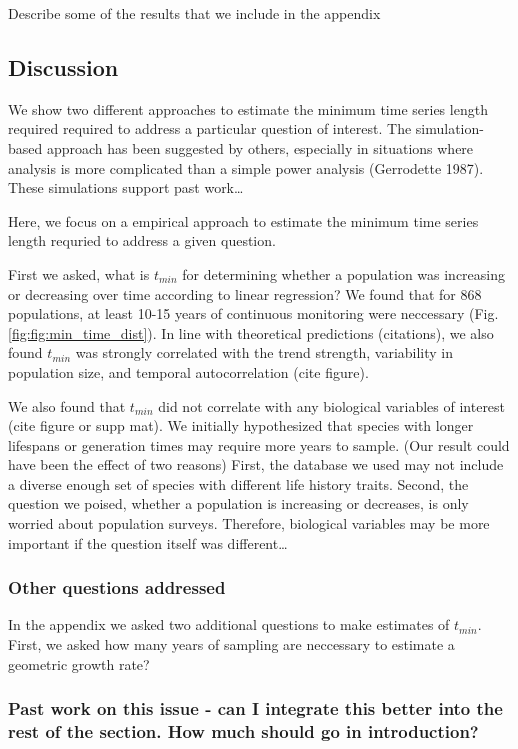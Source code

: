 \documentclass[12pt,]{article}
\begin{document}
Describe some of the results that we include in the appendix

\subsection{Discussion}\label{discussion}

We show two different approaches to estimate the minimum time series
length required required to address a particular question of interest.
The simulation-based approach has been suggested by others, especially
in situations where analysis is more complicated than a simple power
analysis (Gerrodette 1987). These simulations support past work\ldots{}

Here, we focus on a empirical approach to estimate the minimum time
series length requried to address a given question.

First we asked, what is \(t_{min}\) for determining whether a population
was increasing or decreasing over time according to linear regression?
We found that for 868 populations, at least 10-15 years of continuous
monitoring were neccessary (Fig. \ref{fig:fig:min_time_dist}). In line
with theoretical predictions (citations), we also found \(t_{min}\) was
strongly correlated with the trend strength, variability in population
size, and temporal autocorrelation (cite figure).

We also found that \(t_{min}\) did not correlate with any biological
variables of interest (cite figure or supp mat). We initially
hypothesized that species with longer lifespans or generation times may
require more years to sample. (Our result could have been the effect of
two reasons) First, the database we used may not include a diverse
enough set of species with different life history traits. Second, the
question we poised, whether a population is increasing or decreases, is
only worried about population surveys. Therefore, biological variables
may be more important if the question itself was different\ldots{}

\subsubsection{Other questions
addressed}\label{other-questions-addressed}

In the appendix we asked two additional questions to make estimates of
\(t_{min}\). First, we asked how many years of sampling are neccessary
to estimate a geometric growth rate?

\subsubsection{Past work on this issue - can I integrate this better
into the rest of the section. How much should go in
introduction?}\label{past-work-on-this-issue---can-i-integrate-this-better-into-the-rest-of-the-section.-how-much-should-go-in-introduction}
\end{document}
